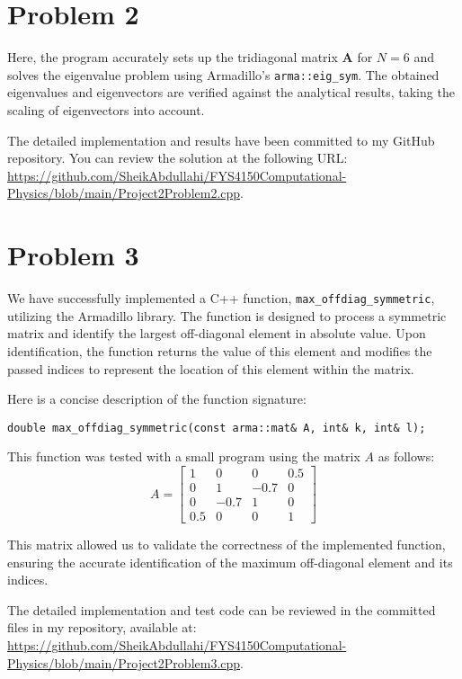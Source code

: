 \documentclass{article}
\begin{document}
\section*{Problem 2}

Here, the program accurately sets up the tridiagonal matrix \( \mathbf{A} \) for \( N=6 \) and solves the eigenvalue problem using Armadillo's \texttt{arma::eig\_sym}. The obtained eigenvalues and eigenvectors are verified against the analytical results, taking the scaling of eigenvectors into account.

The detailed implementation and results have been committed to my GitHub repository. You can review the solution at the following URL: \url{https://github.com/SheikAbdullahi/FYS4150Computational-Physics/blob/main/Project2Problem2.cpp}.

\section*{Problem 3}

We have successfully implemented a C++ function, \texttt{max\_offdiag\_symmetric}, utilizing the Armadillo library. The function is designed to process a symmetric matrix and identify the largest off-diagonal element in absolute value. Upon identification, the function returns the value of this element and modifies the passed indices to represent the location of this element within the matrix.

Here is a concise description of the function signature:
\begin{verbatim}
double max_offdiag_symmetric(const arma::mat& A, int& k, int& l);
\end{verbatim}

This function was tested with a small program using the matrix \( A \) as follows:
\[
A = \begin{bmatrix}
    1 & 0 & 0 & 0.5 \\
    0 & 1 & -0.7 & 0 \\
    0 & -0.7 & 1 & 0 \\
    0.5 & 0 & 0 & 1
\end{bmatrix}
\]

This matrix allowed us to validate the correctness of the implemented function, ensuring the accurate identification of the maximum off-diagonal element and its indices.

The detailed implementation and test code can be reviewed in the committed files in my repository, available at: \url{https://github.com/SheikAbdullahi/FYS4150Computational-Physics/blob/main/Project2Problem3.cpp}.
\end{document}
